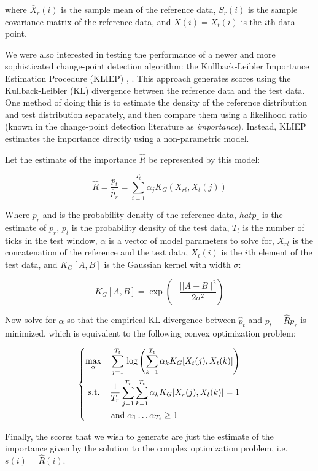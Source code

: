 where $\bar{X}_r(i)$ is the sample mean of the reference data, $S_r(i)$
is the sample covariance matrix of the reference data, and $X(i)=X_t(i)$ is
the $i$th data point.

We were also interested in testing the performance of a newer and more
sophisticated change-point detection algorithm: the
Kullback-Leibler Importance Estimation Procedure (KLIEP)
\cite{sugiyama09}, \cite{sugiyama08}.
This approach generates scores using the Kullback-Leibler (KL)
divergence between the reference data and the test data. One method of doing this
is to estimate the density of the reference distribution and test distribution
separately, and then compare them using a likelihood ratio
(known in the change-point detection literature as \emph{importance}). 
Instead, KLIEP estimates the importance directly using a non-parametric model.

Let the estimate of the importance $\hat{R}$ be represented by this model:

\[
\hat{R} = \frac{p_t}{\hat{p}_r} = \sum_{i=1}^{T_t} \alpha_j K_G(X_{rt},X_t(j))
\]

Where $p_r$ and is the probability density of the reference data,
$hat{p}_r$ is the estimate of $p_r$,
$p_t$ is the probability density of the test
data, $T_t$ is the number of ticks in the test window, $\alpha$ is a
vector of model parameters to solve for, $X_{rt}$ is the concatenation of the reference and the
test data, $X_t(i)$ is the $i$th element of the test data,
and $K_G[A,B]$ is the Gaussian kernel with width $\sigma$:

\[
K_G[A,B] = \exp \left(-\frac{||A-B||^2}{2\sigma^2}\right)
\]

Now solve for $\alpha$ so that the empirical KL divergence between $\hat{p}_t$ and
$p_t = \hat{R}p_r$ is minimized, which is equivalent to the following convex optimization
problem:

\[
\begin{dcases}
 \max_{\alpha} \quad \sum_{j=1}^{T_t} \, \log \left( \sum_{k=1}^{T_t} \alpha_k K_G[X_t(j), X_t(k)] \right) \\
 \,\, \text{s.t.} \quad\, \frac{1}{T_r} \sum_{j=1}^{T_r} \sum_{k=1}^{T_t} \alpha_k K_G[X_r(j),X_t(k)] = 1 \\
 \qquad \quad \text{and} \; \alpha_1 \ldots \alpha_{T_t} \ge 1
\end{dcases}
\]

Finally, the scores that we wish to generate are just the estimate of the importance given by the
solution to the complex optimization problem, i.e. $s(i) = \hat{R}(i)$.

